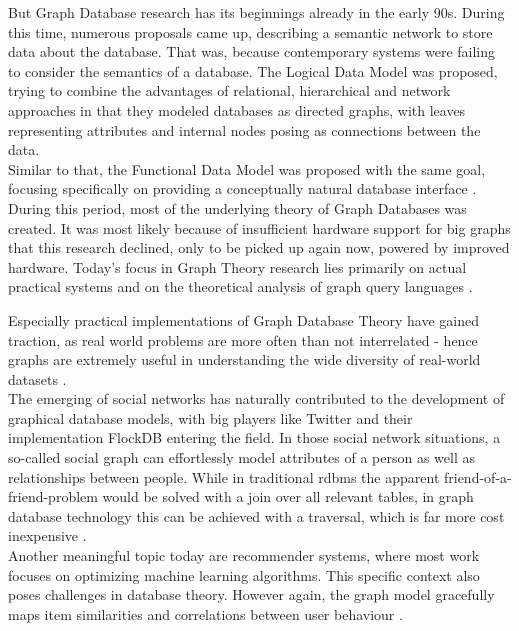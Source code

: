 But Graph Database research has its beginnings already in the early 90s. During this time, numerous proposals came up, describing a semantic network to store data about the database. That was, because contemporary systems were failing to consider the semantics of a database.
The Logical Data Model \autocite{KUPERLDM} was proposed, trying to combine the advantages of relational, hierarchical and network approaches in that they modeled databases as directed graphs, with leaves representing attributes and internal nodes posing as connections between the data. \\
Similar to that, the Functional Data Model \autocite{Shipman1979} was proposed with the same goal, focusing specifically on providing a conceptually natural database interface \autocite{Angles2018AnIT}. \\
During this period, most of the underlying theory of Graph Databases was created.
It was most likely because of insufficient hardware support for big graphs that this research declined, only to be picked up again now, powered by improved hardware. Today's focus in Graph Theory research lies primarily on actual practical systems and on the theoretical analysis of graph query languages \autocite{Angles2018AnIT}.

Especially practical implementations of Graph Database Theory have gained traction, as real world problems are more often than not interrelated - hence graphs are extremely useful in understanding the wide diversity of real-world datasets \autocite{Robinson2013}. \\
The emerging of social networks has naturally contributed to the development of graphical database models, with big players like Twitter and their implementation FlockDB entering the field. In those social network situations, a so-called social graph can effortlessly model attributes of a person as well as relationships between people. While in traditional \gls{rdbms} the apparent friend-of-a-friend-problem would be solved with a join over all relevant tables, in graph database technology this can be achieved with a traversal, which is far more cost inexpensive \autocite{Miller2013GraphDA}. \\
Another meaningful topic today are recommender systems, where most work focuses on optimizing machine learning algorithms. This specific context also poses challenges in database theory. However again, the graph model gracefully maps item similarities and correlations between user behaviour \autocite{Huang2002}.

